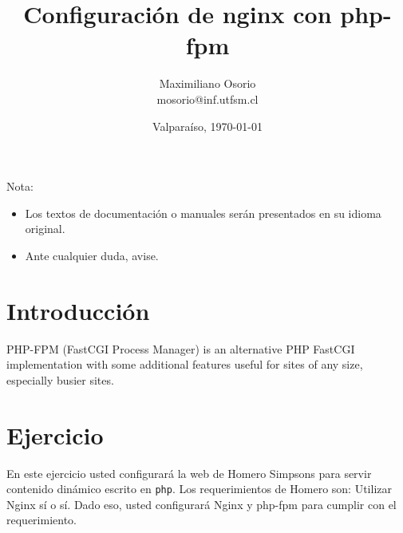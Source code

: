 \documentclass[11pt]{exam}
\title{Configuración de nginx con php-fpm} \author{Maximiliano Osorio \\ mosorio@inf.utfsm.cl}
\date{Valparaíso, \today}
\begin{document}
\maketitle
{}
\vspace{5mm}

Nota:
\begin{itemize}
	\item Los textos de documentación o manuales serán presentados en su idioma original.
	\item Ante cualquier duda, avise.
\end{itemize}

\section{Introducción}
PHP-FPM (FastCGI Process Manager) is an alternative PHP FastCGI implementation with some additional features useful for sites of any size, especially busier sites.

\section{Ejercicio}
En este ejercicio usted configurará la web de Homero Simpsons para servir contenido dinámico escrito en \texttt{php}. Los requerimientos de Homero son: Utilizar Nginx sí o sí. Dado eso, usted configurará Nginx y php-fpm para cumplir con el requerimiento.
\end{document}

